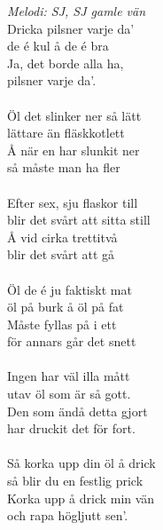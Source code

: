 {\footnotesize\textit{Melodi: SJ, SJ gamle vän}}
\vspace{10pt}
\\
Dricka pilsner varje da'\\
de é kul å de é bra\\
Ja, det borde alla ha,\\
pilsner varje da'.\\
\\
Öl det slinker ner så lätt\\
lättare än fläskkotlett\\
Å när en har slunkit ner\\
så måste man ha fler\\
\\
Efter sex, sju flaskor till\\
blir det svårt att sitta still\\
Å vid cirka trettitvå\\
blir det svårt att gå\\
\\
Öl de é ju faktiskt mat\\
öl på burk å öl på fat\\
Måste fyllas på i ett\\
för annars går det snett\\
\\
Ingen har väl illa mått\\
utav öl som är så gott.\\
Den som ändå detta gjort\\
har druckit det för fort.\\
\\
Så korka upp din öl å drick\\
så blir du en festlig prick\\
Korka upp å drick min vän\\
och rapa högljutt sen'.
